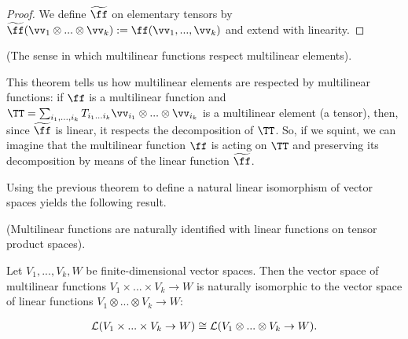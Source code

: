 \begin{proof}
    We define $\widetilde{\ff}$ on elementary tensors by $\widetilde{\ff}(\vv_1 \otimes ... \otimes \vv_k) := \ff(\vv_1, ..., \vv_k)$ and extend with linearity.
\end{proof}

\begin{remark}
    (The sense in which multilinear functions respect multilinear elements).
        
   This theorem tells us how multilinear elements are respected by multilinear functions: if $\ff$ is a multilinear function and $\TT = \sum_{i_1, ..., i_k} T_{i_1 ... i_k} \vv_{i_1} \otimes ... \otimes \vv_{i_k}$ is a multilinear element (a tensor), then, since $\widetilde{\ff}$ is linear, it respects the decomposition of $\TT$. So, if we squint, we can imagine that the multilinear function $\ff$ is acting on $\TT$ and preserving its decomposition by means of the linear function $\widetilde{\ff}$.
\end{remark}

Using the previous theorem to define a natural linear isomorphism of vector spaces yields the following result.

\begin{theorem}
\label{ch::motivated_intro::thm::multilin_fns_iso_lin_fns}
    (Multilinear functions are naturally identified with linear functions on tensor product spaces).
    
    Let $V_1, ..., V_k, W$ be finite-dimensional vector spaces. Then the vector space of multilinear functions ${V_1 \times ... \times V_k \rightarrow W}$ is naturally isomorphic to the vector space of linear functions ${V_1 \otimes ... \otimes V_k \rightarrow W}$:
    
    \begin{align*}
        \mathcal{L}(V_1 \times ... \times V_k \rightarrow W) \cong \mathcal{L}(V_1 \otimes ... \otimes V_k \rightarrow W).
    \end{align*}
\end{theorem}

